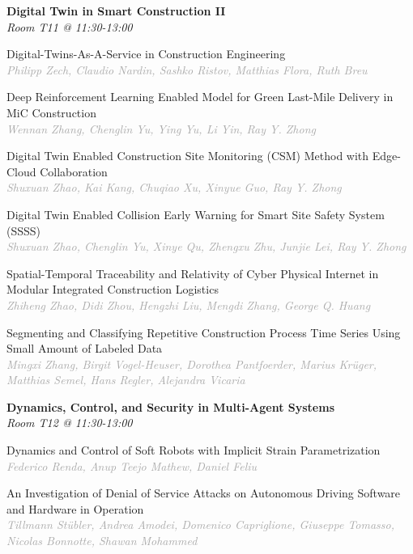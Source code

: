 \begin{multicols*}{2}
\normalsize \textbf{Digital Twin in Smart Construction II}\\
\small \textit{Room T11 @ 11:30-13:00}

\small Digital-Twins-As-A-Service in Construction Engineering\\ 
\footnotesize \textcolor{darkgray}{\textit{Philipp Zech, Claudio  Nardin, Sashko  Ristov, Matthias  Flora, Ruth  Breu}}

\small Deep Reinforcement Learning Enabled Model for Green Last-Mile Delivery in MiC Construction\\ 
\footnotesize \textcolor{darkgray}{\textit{Wennan Zhang, Chenglin  Yu, Ying  Yu, Li  Yin, Ray Y.  Zhong}}

\small Digital Twin Enabled Construction Site Monitoring (CSM) Method with Edge-Cloud Collaboration\\ 
\footnotesize \textcolor{darkgray}{\textit{Shuxuan Zhao, Kai  Kang, Chuqiao  Xu, Xinyue  Guo, Ray Y.  Zhong}}

\small Digital Twin Enabled Collision Early Warning for Smart Site Safety System (SSSS)\\ 
\footnotesize \textcolor{darkgray}{\textit{Shuxuan Zhao, Chenglin  Yu, Xinye  Qu, Zhengxu  Zhu, Junjie  Lei, Ray Y.  Zhong}}

\small Spatial-Temporal Traceability and Relativity of Cyber Physical Internet in Modular Integrated Construction Logistics\\ 
\footnotesize \textcolor{darkgray}{\textit{Zhiheng Zhao, Didi  Zhou, Hengzhi  Liu, Mengdi  Zhang, George Q.  Huang}}

\small Segmenting and Classifying Repetitive Construction Process Time Series Using Small Amount of Labeled Data\\ 
\footnotesize \textcolor{darkgray}{\textit{Mingxi Zhang, Birgit  Vogel-Heuser, Dorothea  Pantfoerder, Marius  Krüger, Matthias  Semel, Hans  Regler, Alejandra  Vicaria}}

\normalsize \textbf{Dynamics, Control, and Security in Multi-Agent Systems}\\
\small \textit{Room T12 @ 11:30-13:00}

\small Dynamics and Control of Soft Robots with Implicit Strain Parametrization\\ 
\footnotesize \textcolor{darkgray}{\textit{Federico Renda, Anup Teejo  Mathew, Daniel  Feliu}}

\small An Investigation of Denial of Service Attacks on Autonomous Driving Software and Hardware in Operation\\ 
\footnotesize \textcolor{darkgray}{\textit{Tillmann Stübler, Andrea  Amodei, Domenico  Capriglione, Giuseppe  Tomasso, Nicolas  Bonnotte, Shawan  Mohammed}}


\end{multicols*}
